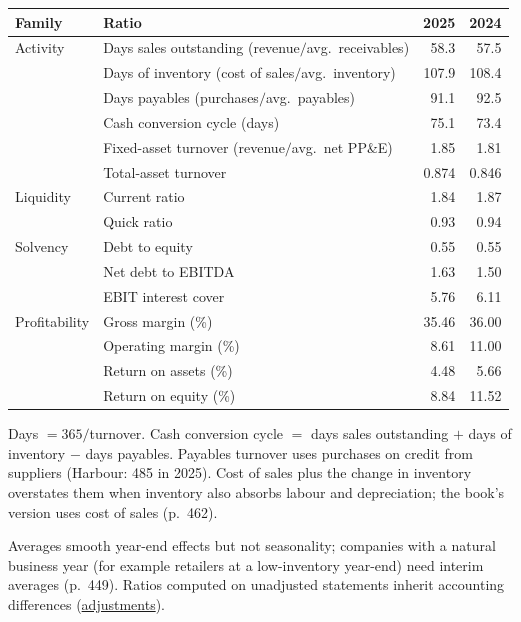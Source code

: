 \begin{qfmethod}
\begin{center}\small
\begin{tabular}{@{}llrr@{}}
\toprule
Family & Ratio & 2025 & 2024\\
\midrule
Activity & Days sales outstanding (revenue$/$avg.\ receivables) & 58.3 & 57.5\\
 & Days of inventory (cost of sales$/$avg.\ inventory) & 107.9 & 108.4\\
 & Days payables (purchases$/$avg.\ payables) & 91.1 & 92.5\\
 & Cash conversion cycle (days) & 75.1 & 73.4\\
 & Fixed-asset turnover (revenue$/$avg.\ net PP\&E) & 1.85 & 1.81\\
 & Total-asset turnover & 0.874 & 0.846\\
Liquidity & Current ratio & 1.84 & 1.87\\
 & Quick ratio & 0.93 & 0.94\\
Solvency & Debt to equity & 0.55 & 0.55\\
 & Net debt to EBITDA & 1.63 & 1.50\\
 & EBIT interest cover & 5.76 & 6.11\\
Profitability & Gross margin (\%) & 35.46 & 36.00\\
 & Operating margin (\%) & 8.61 & 11.00\\
 & Return on assets (\%) & 4.48 & 5.66\\
 & Return on equity (\%) & 8.84 & 11.52\\
\bottomrule
\end{tabular}
\end{center}

 Days $=365/$turnover. Cash conversion cycle $=$ days sales outstanding $+$ days of inventory $-$ days payables. Payables turnover uses purchases on credit from suppliers (Harbour: 485 in 2025). Cost of sales plus the change in inventory overstates them when inventory also absorbs labour and depreciation; the book's version uses cost of sales (p.~462).

 Averages smooth year-end effects but not seasonality; companies with a natural business year (for example retailers at a low-inventory year-end) need interim averages (p.~449). Ratios computed on unadjusted statements inherit accounting differences (\hyperref[meth:accounting-analysis-adjustments]{adjustments}).


\end{qfmethod}
